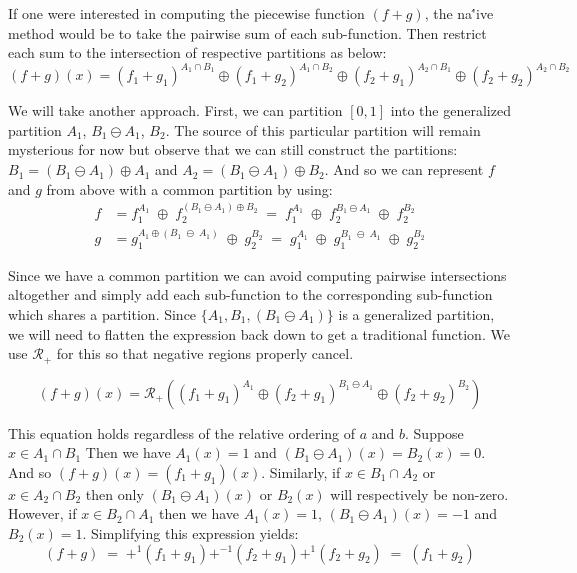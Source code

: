 If one were interested in computing the piecewise function $(f+g)$, the na\''{i}ve method would be to take the pairwise
sum of each sub-function. 
Then restrict each sum to the intersection of respective partitions as below:
\begin{equation}
	(f+g)(x) = (f_1 + g_1)^{A_1 \cap B_1} 
		\oplus (f_1 + g_2)^{A_1 \cap B_2} 
		\oplus (f_2 + g_1)^{A_2 \cap B_1}
		\oplus (f_2 + g_2)^{A_2 \cap B_2}
\end{equation}

We will take another approach.
First, we can partition $[0,1]$ into the generalized partition $A_1$, $B_1 \ominus A_1$, $B_2$.
The source of this particular partition will remain mysterious for now but observe that we can still construct the partitions:
$B_1 = (B_1 \ominus A_1) \oplus A_1$ and $A_2 = (B_1 \ominus A_1) \oplus B_2$.
And so we can represent $f$ and $g$ from above with a common partition by using:
\begin{align}
	f &=  f_1^{A_1} \;\oplus\; f_2^{(B_1 \ominus A_1) \oplus B_2}
		\;=\; f_1^{A_1} \;\oplus\; f_2^{B_1 \ominus A_1} \;\oplus\; f_2^{B_2} \\
	g &= g_1^{A_1 \oplus (B_1 \;\ominus\; A_1)} \;\oplus\; g_2^{B_2}
		\;=\; g_1^{A_1} \;\oplus\; g_1^{B_1 \;\ominus\; A_1} \;\oplus\; g_2^{B_2}
\end{align}

Since we have a common partition we can avoid computing pairwise intersections altogether and simply add each 
sub-function to the corresponding sub-function which shares a partition.
Since $\{ A_1 , B_1, (B_1 \ominus A_1) \}$ is a generalized partition, we will need to flatten the expression back down
to get a traditional function.
We use $\mathcal{R}_+$ for this so that negative regions properly cancel. 

\begin{equation}
	(f+g)(x) = \mathcal{R}_+ \left( (f_1 + g_1)^{A_1} 
			\oplus (f_2 + g_1)^{B_1 \ominus A_1} 
			\oplus (f_2 + g_2)^{B_2} \right)
\end{equation}


This equation holds regardless of the relative ordering of $a$ and $b$.
Suppose $x \in A_1 \cap B_1$
Then we have $A_1(x)= 1$ and $(B_1 \ominus A_1)(x) = B_2(x) = 0$.
And so $(f+g)(x) = (f_1 + g_1)(x)$.
Similarly, if $x \in B_1 \cap A_2$ or $x \in A_2 \cap B_2$ then 
only $(B_1 \ominus A_1)(x)$ or $B_2(x)$ will respectively be non-zero.
However, if $x \in B_2 \cap A_1$ then we have $A_1(x) = 1$, $(B_1 \ominus A_1)(x) = -1$ and $B_2(x) = 1$.
Simplifying this expression yields:
\begin{equation}
	(f+g) \;=\; +^1 (f_1 + g_1) +^{-1} (f_2 + g_1) +^1 (f_2 + g_2) \;=\; (f_1 + g_2)
\end{equation}


